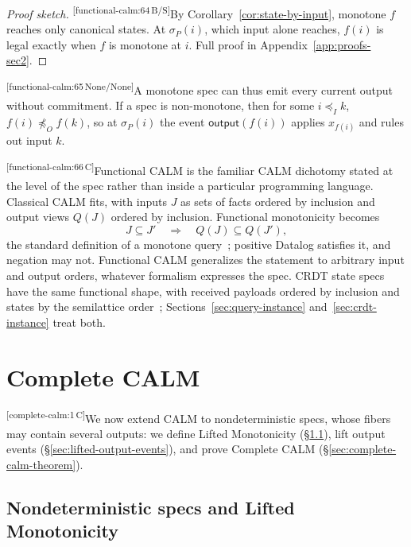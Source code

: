 \documentclass[sigconf]{cidr-2027}
\theoremstyle{remark}
\newcommand{\InputOrd}{\preceq_I}
\newcommand{\OutputOrd}{\preceq_O}
\newcommand{\commitment}{commitment\xspace}
\newcommand{\cxtag}[2]{\textsuperscript{\textsf{\tiny[#1\,#2]}}}
\begin{document}
\color{blue!75!black}\begin{proof}[Proof sketch]
\cxtag{functional-calm:64}{B/S}By Corollary~\ref{cor:state-by-input}, monotone $f$ reaches only canonical
states. At $\sigma_P(i)$, which input alone reaches, $f(i)$ is legal exactly
when $f$ is monotone at $i$.  Full proof in Appendix~\ref{app:proofs-sec2}.\color{black}
\end{proof}

\color{black}\cxtag{functional-calm:65}{None/None}A monotone spec can thus emit every current output without \commitment. If a
spec is non-monotone, then for some $i\InputOrd k$,
$f(i)\not\OutputOrd f(k)$, so at $\sigma_P(i)$ the event
$\mathsf{output}(f(i))$ applies $x_{f(i)}$ and rules out input $k$.\color{black}

\color{black!45}\cxtag{functional-calm:66}{C}Functional CALM is the familiar CALM dichotomy stated at the level of the spec
rather than inside a particular programming language.
Classical CALM fits, with inputs $J$ as sets of facts ordered by
inclusion and output views $Q(J)$ ordered by inclusion.  Functional
monotonicity becomes
        \begin{equation}
  J\subseteq J'
  \quad\Longrightarrow\quad
  Q(J)\subseteq Q(J'),
  \label{eq:query-monotonicity}
        \end{equation}
the standard definition of a monotone query~\cite{abiteboul1995foundations};
positive Datalog satisfies it, and negation may not.  Functional CALM
generalizes the statement to arbitrary input and
output orders, whatever formalism expresses the spec.  CRDT state specs have the same functional shape, with received payloads ordered by inclusion and states by the semilattice order~\cite{shapiro2011crdt}; Sections~\ref{sec:query-instance}
and~\ref{sec:crdt-instance} treat both.\color{black}

\section{Complete CALM}
\label{sec:complete-calm}

\color{black!45}\cxtag{complete-calm:1}{C}We now extend CALM to nondeterministic specs, whose fibers may contain several outputs: we define Lifted Monotonicity (\S\ref{sec:relational-specifications}), lift output events (\S\ref{sec:lifted-output-events}), and prove Complete CALM (\S\ref{sec:complete-calm-theorem}).\color{black}

\subsection{Nondeterministic specs and Lifted Monotonicity}
\label{sec:relational-specifications}
\end{document}
